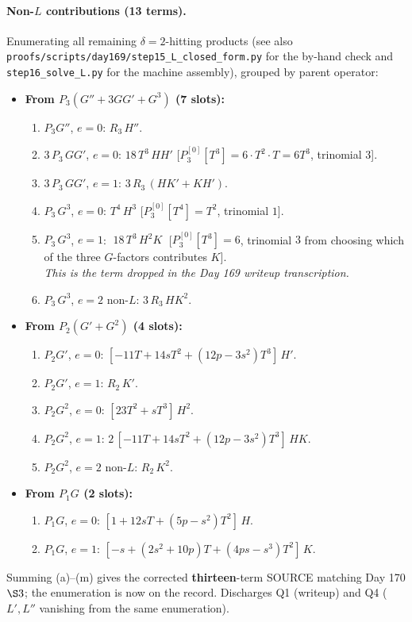 \documentclass[11pt]{article}
\begin{document}
\paragraph{Non-$L$ contributions (13 terms).}
Enumerating all remaining $\delta = 2$-hitting products (see also
\texttt{proofs/scripts/day169/step15\_L\_closed\_form.py} for the
by-hand check and \texttt{step16\_solve\_L.py} for the machine
assembly), grouped by parent operator:
\begin{itemize}[nosep, leftmargin=1.5em]
\item \textbf{From $P_3(G'' + 3 GG' + G^3)$ (7 slots):}
\begin{enumerate}[label=(\alph*), nosep, leftmargin=1em]
  \item $P_3 G''$, $e = 0$: $R_3\, H''$.
  \item $3\, P_3\, GG'$, $e = 0$: $18\, T^3\, HH'$
        [$P_3^{[0]}[T^3] = 6\cdot T^2 \cdot T = 6 T^3$, trinomial $3$].
  \item $3\, P_3\, GG'$, $e = 1$: $3\, R_3\, (H K' + K H')$.
  \item $P_3\, G^3$, $e = 0$: $T^4\, H^3$
        [$P_3^{[0]}[T^4] = T^2$, trinomial $1$].
  \item $P_3\, G^3$, $e = 1$: $\boxed{\;18\, T^3\, H^2 K\;}$
        [$P_3^{[0]}[T^3] = 6$, trinomial $3$ from choosing which of
         the three $G$-factors contributes $K$].\\
        \emph{This is the term dropped in the Day 169 writeup transcription.}
  \item $P_3\, G^3$, $e = 2$ non-$L$: $3\, R_3\, H K^2$.
\end{enumerate}
\item \textbf{From $P_2(G' + G^2)$ (4 slots):}
\begin{enumerate}[label=(\alph*), nosep, leftmargin=1em, resume]
  \item $P_2 G'$, $e = 0$: $[-11 T + 14 s T^2 + (12 p - 3 s^2) T^3]\, H'$.
  \item $P_2 G'$, $e = 1$: $R_2\, K'$.
  \item $P_2 G^2$, $e = 0$: $[23 T^2 + s T^3]\, H^2$.
  \item $P_2 G^2$, $e = 1$: $2\, [-11 T + 14 s T^2 + (12 p - 3 s^2) T^3]\, H K$.
  \item $P_2 G^2$, $e = 2$ non-$L$: $R_2\, K^2$.
\end{enumerate}
\item \textbf{From $P_1 G$ (2 slots):}
\begin{enumerate}[label=(\alph*), nosep, leftmargin=1em, resume]
  \item $P_1 G$, $e = 0$: $[1 + 12 s T + (5 p - s^2) T^2]\, H$.
  \item $P_1 G$, $e = 1$: $[-s + (2 s^2 + 10 p) T + (4 p s - s^3) T^2]\, K$.
\end{enumerate}
\end{itemize}
Summing (a)--(m) gives the corrected \textbf{thirteen}-term SOURCE
matching Day 170 $\S 3$; the enumeration is now on the record.
Discharges Q1 (writeup) and Q4 ($L', L''$ vanishing from the same
enumeration).
\end{document}
